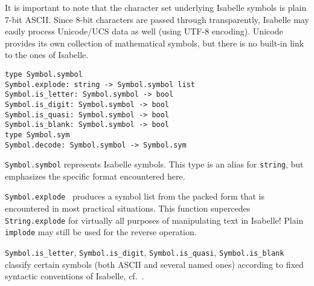 \begin{isabellebody}
\begin{isamarkuptext}
  \medskip It is important to note that the character set underlying
  Isabelle symbols is plain 7-bit ASCII.  Since 8-bit characters are
  passed through transparently, Isabelle may easily process
  Unicode/UCS data as well (using UTF-8 encoding).  Unicode provides
  its own collection of mathematical symbols, but there is no built-in
  link to the ones of Isabelle.%
\end{isamarkuptext}%
\isamarkuptrue%
%
\isadelimmlref
%
\endisadelimmlref
%
\isatagmlref
%
\begin{isamarkuptext}%
\begin{mldecls}
  \verb|type Symbol.symbol| \\
  \verb|Symbol.explode: string -> Symbol.symbol list| \\
  \verb|Symbol.is_letter: Symbol.symbol -> bool| \\
  \verb|Symbol.is_digit: Symbol.symbol -> bool| \\
  \verb|Symbol.is_quasi: Symbol.symbol -> bool| \\
  \verb|Symbol.is_blank: Symbol.symbol -> bool| \\[1ex]
  \verb|type Symbol.sym| \\
  \verb|Symbol.decode: Symbol.symbol -> Symbol.sym| \\
  \end{mldecls}

  \begin{description}

  \item \verb|Symbol.symbol| represents Isabelle symbols.  This
  type is an alias for \verb|string|, but emphasizes the
  specific format encountered here.

  \item \verb|Symbol.explode|~ produces a symbol list from
  the packed form that is encountered in most practical situations.
  This function supercedes \verb|String.explode| for virtually all
  purposes of manipulating text in Isabelle!  Plain \verb|implode|
  may still be used for the reverse operation.

  \item \verb|Symbol.is_letter|, \verb|Symbol.is_digit|, \verb|Symbol.is_quasi|, \verb|Symbol.is_blank| classify certain symbols
  (both ASCII and several named ones) according to fixed syntactic
  conventions of Isabelle, cf.\ \cite{isabelle-isar-ref}.


\end{description}
\end{isamarkuptext}
\end{isabellebody}
